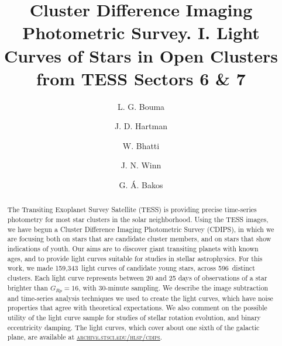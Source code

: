 \documentclass[12pt,twocolumn,tighten,trackchanges]{aastex62}
\newcommand{\numberlcs}{159{,}343\ } %
\newcommand{\numberclusters}{596\ } %
\newcommand{\stscilink}{\textsc{\url{archive.stsci.edu/hlsp/cdips}}}
\begin{document}
\title{
  Cluster Difference Imaging Photometric Survey. I.
  Light Curves of Stars in Open Clusters from TESS Sectors 6 \& 7
}


\author[0000-0002-0514-5538]{L. G. Bouma}
%
\author[0000-0001-8732-6166]{J. D. Hartman}
%
\author[0000-0002-0628-0088]{W. Bhatti}
%
\author[0000-0002-4265-047X]{J. N. Winn}
%
\author[0000-0001-7204-6727]{G. \'A. Bakos}

\begin{abstract}
  The Transiting Exoplanet Survey Satellite (TESS) is providing
  precise time-series photometry for most star clusters in the solar
  neighborhood.
  Using the TESS images, we have begun a Cluster Difference Imaging
  Photometric Survey (CDIPS), in which we are focusing both on stars
  that are candidate cluster members, and on stars that show
  indications of youth.
  Our aims are to discover giant transiting planets with known ages,
  and to provide light curves suitable for studies in stellar
  astrophysics.
  For this work, we made \numberlcs light curves of candidate young
  stars, across \numberclusters distinct clusters.  Each light curve
  represents between 20 and 25 days of observations of a star brighter
  than $G_{Rp}=16$, with 30-minute sampling.
  We describe the image subtraction and time-series analysis
  techniques we used to create the light curves, which have noise
  properties that agree with theoretical expectations.
  We also comment on the possible utility of the light curve sample
  for studies of stellar rotation evolution, and binary eccentricity
  damping.
  The light curves, which cover about one sixth of the galactic plane,
  are available at \stscilink.
\end{abstract}

\end{document}
